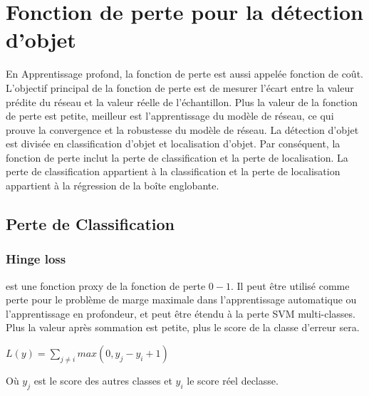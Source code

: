 \section{Fonction de perte pour la détection d'objet}
En Apprentissage profond, la fonction de perte est aussi appelée fonction de coût. L'objectif principal de la fonction de perte est de mesurer l'écart entre la valeur prédite du réseau et la valeur réelle de l'échantillon. Plus la valeur de la fonction de perte est petite, meilleur est l'apprentissage du modèle de réseau, ce qui prouve la convergence et la robustesse du modèle de réseau. La détection d'objet est divisée en classification d'objet et localisation d'objet. Par conséquent, la fonction de perte inclut la perte de classification et la perte de localisation. La perte de classification appartient à la classification et la perte de localisation appartient à la régression de la boîte englobante.

     \subsection{Perte de Classification}
          \subsubsection{Hinge loss}
          est une fonction proxy de la fonction de perte $0-1$. Il peut être utilisé comme perte pour le problème de marge maximale dans l'apprentissage automatique ou l'apprentissage en profondeur, et peut être étendu à la perte SVM multi-classes. Plus la valeur après sommation est petite, plus le score de la classe d'erreur sera.
          \begin{center} $L(y)=\sum_{j \neq i}max(0,y_j-y_i+1)$ \end{center}

          Où $y_j$ est le score des autres classes et $y_i$ le score réel declasse.	

